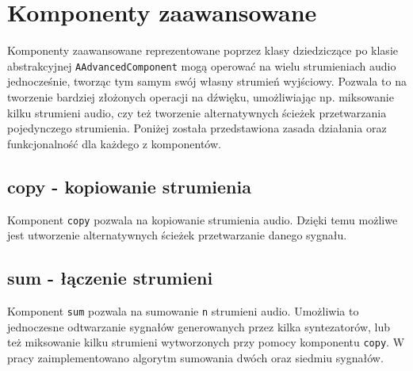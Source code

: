 \section{Komponenty zaawansowane}
Komponenty zaawansowane reprezentowane poprzez klasy dziedziczące po klasie abstrakcyjnej \texttt{AAdvancedComponent} mogą operować na wielu strumieniach audio jednocześnie, tworząc tym samym swój własny strumień wyjściowy. Pozwala to na tworzenie bardziej złożonych operacji na dźwięku, umożliwiając np. miksowanie kilku strumieni audio, czy też tworzenie alternatywnych ścieżek przetwarzania pojedynczego strumienia. Poniżej została przedstawiona zasada działania oraz funkcjonalność dla każdego z komponentów.

\subsection{copy - kopiowanie strumienia}
Komponent \texttt{copy} pozwala na kopiowanie strumienia audio. Dzięki temu możliwe jest utworzenie alternatywnych ścieżek przetwarzanie danego sygnału.

\subsection{sum - łączenie strumieni}
Komponent \texttt{sum} pozwala na sumowanie \texttt{n} strumieni audio. Umożliwia to jednoczesne odtwarzanie sygnałów generowanych przez kilka syntezatorów, lub też miksowanie kilku strumieni wytworzonych przy pomocy komponentu \texttt{copy}. W pracy zaimplementowano algorytm sumowania dwóch oraz siedmiu sygnałów.